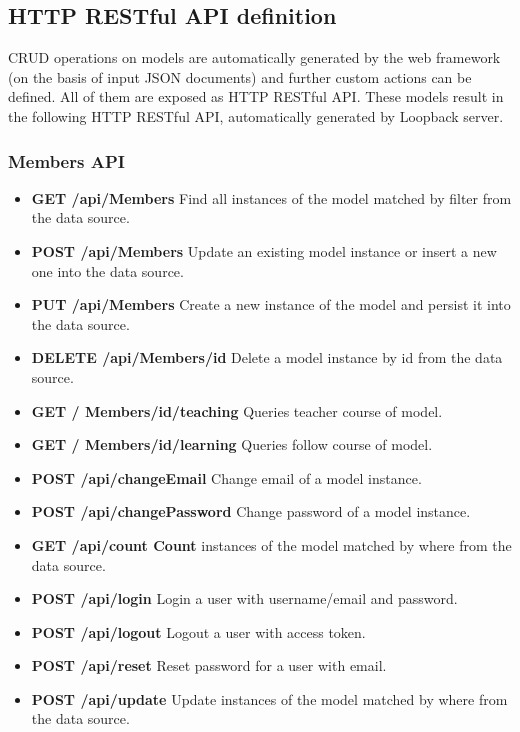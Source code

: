 \subsection {HTTP RESTful API definition}
\label{subsec:HTTP_RESTful_API_definition}

CRUD operations on models are automatically generated by the web framework (on the basis of input JSON documents) and further custom actions can be defined. All of them are exposed as HTTP RESTful API.
These models result in the following HTTP RESTful API, automatically generated by Loopback server.

\subsubsection{ Members API}
\begin{itemize}
\item \textbf{GET /api/Members} Find all instances of the model matched by filter from  the  data source.
\item \textbf{POST /api/Members} Update an existing model instance or insert a new one into the data  source.
\item \textbf{PUT /api/Members} Create a new instance of the model and persist it into the data source.
\item \textbf{DELETE /api/Members/id} Delete a model instance by id from the data source.
\item \textbf{GET / Members/id/teaching} {\color{red}Queries teacher course of model.}

\item \textbf{GET / Members/id/learning} {\color{red} Queries follow course of model.}

\item \textbf{POST /api/changeEmail} Change email of a model instance.
\item \textbf{POST /api/changePassword} Change password of a model instance.
\item \textbf{GET /api/count Count} instances of the model matched by where from the  data source.
\item \textbf{POST /api/login} Login a user with username/email and password.
\item \textbf{POST /api/logout} Logout a user with access   token.
\item \textbf{POST /api/reset} Reset password for a user with email.
\item \textbf{POST /api/update} Update instances of the model matched by where from the data source.
\end{itemize}


